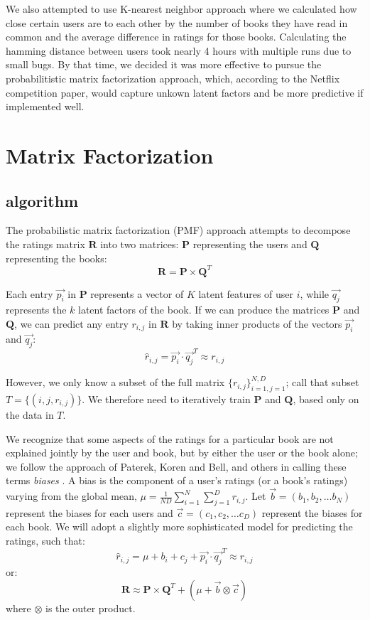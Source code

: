 \documentclass[11pt]{amsart}
\newcommand{\mat}[1]{\mathbf{#1}}
\begin{document}
We also attempted to use K-nearest neighbor approach where we calculated how close certain users are to each other by the number of books they have read in common and the average difference in ratings for those books. Calculating the hamming distance between users took nearly 4 hours with multiple runs due to small bugs. By that time, we decided it was more effective to pursue the probabilitistic matrix factorization approach, which, according to the Netflix competition paper, would capture unkown latent factors and be more predictive if implemented well. 

\section{Matrix Factorization}
\subsection{algorithm}
The probabilistic matrix factorization (PMF) approach \cite{Mnih:2007wg} attempts to decompose the ratings matrix $\mat{R}$ into two matrices: $\mat{P}$ representing the users and $\mat{Q}$ representing the books:
$$\mat{R} = \mat{P} \times \mat{Q}^T$$

Each entry $\vec{p_i}$ in $\mat{P}$ represents a vector of $K$ latent features of user $i$, while $\vec{q_j}$ represents the $k$ latent factors of the book. If we can produce the matrices $\mat{P}$ and $\mat{Q}$, we can predict any entry $r_{i,j}$ in $\mat{R}$ by taking inner products of the vectors $\vec{p_i}$ and $\vec{q_j}$:
$$\hat{r}_{i,j} = \vec{p_i} \cdot \vec{q_j}^T \approx r_{i,j}$$

However, we only know a subset of the full matrix $\{r_{i,j}\}_{i=1, j=1}^{N,D}$; call that subset $T = \{(i, j, r_{i,j})\}$. We therefore need to iteratively train $\mat{P}$ and $\mat{Q}$, based only on the data in $T$. 

We recognize that some aspects of the ratings for a particular book are not explained jointly by the user and book, but by either the user or the book alone; we follow the approach of Paterek, Koren and Bell, and others in calling these terms \emph{biases} \cite{Paterek:2007va,Koren:2009uc}. A bias is the component of a user's ratings (or a book's ratings) varying from the global mean, $\mu = \frac{1}{ND} \sum_{i=1}^{N}\sum_{j=1}^{D} r_{i,j}$. Let $\vec{b} = (b_1, b_2, \ldots b_N)$ represent the biases for each users and $\vec{c} = (c_1, c_2, \ldots c_D)$ represent the biases for each book. We will adopt a slightly more sophisticated model for predicting the ratings, such that:
$$\hat{r}_{i,j} = \mu + b_i + c_j + \vec{p_i} \cdot \vec{q_j}^T \approx r_{i,j}$$
or:
$$\mat{R} \approx \mat{P} \times \mat{Q}^T + (\mu + \vec{b} \otimes \vec{c})$$
where $\otimes$ is the outer product.
\end{document}
